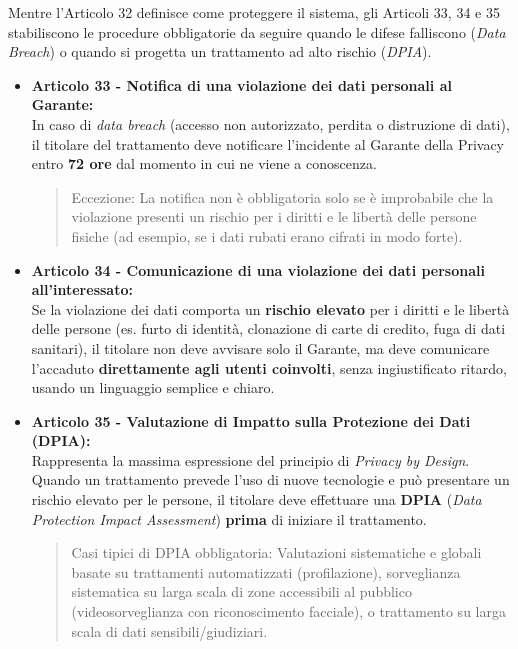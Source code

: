 Mentre l'Articolo 32 definisce come proteggere il sistema, gli Articoli 33, 34 e 35 stabiliscono le procedure obbligatorie da seguire quando le difese falliscono (\textit{Data Breach}) o quando si progetta un trattamento ad alto rischio (\textit{DPIA}).
\begin{itemize}
    \item \textbf{Articolo 33 - Notifica di una violazione dei dati personali al Garante:} \\
    In caso di \textit{data breach} (accesso non autorizzato, perdita o distruzione di dati), il titolare del trattamento deve notificare l'incidente al Garante della Privacy entro \textbf{72 ore} dal momento in cui ne viene a conoscenza.
    \begin{quote}
        Eccezione: La notifica non è obbligatoria solo se è improbabile che la violazione presenti un rischio per i diritti e le libertà delle persone fisiche (ad esempio, se i dati rubati erano cifrati in modo forte).
    \end{quote}
    
    \item \textbf{Articolo 34 - Comunicazione di una violazione dei dati personali all'interessato:} \\
    Se la violazione dei dati comporta un \textbf{rischio elevato} per i diritti e le libertà delle persone (es. furto di identità, clonazione di carte di credito, fuga di dati sanitari), il titolare non deve avvisare solo il Garante, ma deve comunicare l'accaduto \textbf{direttamente agli utenti coinvolti}, senza ingiustificato ritardo, usando un linguaggio semplice e chiaro.
    \item \textbf{Articolo 35 - Valutazione di Impatto sulla Protezione dei Dati (DPIA):} \\
    Rappresenta la massima espressione del principio di \textit{Privacy by Design}. Quando un trattamento prevede l'uso di nuove tecnologie e può presentare un rischio elevato per le persone, il titolare deve effettuare una \textbf{DPIA} (\textit{Data Protection Impact Assessment}) \textbf{prima} di iniziare il trattamento.
    \begin{quote}
        Casi tipici di DPIA obbligatoria: Valutazioni sistematiche e globali basate su trattamenti automatizzati (profilazione), sorveglianza sistematica su larga scala di zone accessibili al pubblico (videosorveglianza con riconoscimento facciale), o trattamento su larga scala di dati sensibili/giudiziari.
    \end{quote}
\end{itemize}

